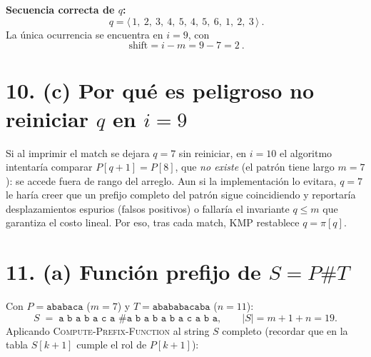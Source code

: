 \documentclass[11pt]{article}
\begin{document}
\smallskip
\noindent\textbf{Secuencia correcta de \(q\):}
\[
\boxed{\ q = \langle\,1,\ 2,\ 3,\ 4,\ 5,\ 4,\ 5,\ 6,\ 1,\ 2,\ 3\,\rangle\ }.
\]
La única ocurrencia se encuentra en \(i=9\), con
\[
\boxed{\ \text{shift} = i - m = 9 - 7 = 2\ }.
\]

\section*{10. (c) Por qué es peligroso no reiniciar \(q\) en \(i=9\)}

Si al imprimir el match se dejara \(q=7\) sin reiniciar, en \(i=10\) el algoritmo intentaría comparar \(P[q{+}1]=P[8]\), que \emph{no existe} (el patrón tiene largo \(m=7\)): se accede fuera de rango del arreglo. Aun si la implementación lo evitara, \(q=7\) le haría creer que un prefijo completo del patrón sigue coincidiendo y reportaría desplazamientos espurios (falsos positivos) o fallaría el invariante \(q\le m\) que garantiza el costo lineal. Por eso, tras cada match, KMP restablece \(q=\pi[q]\).

\clearpage

\section*{11. (a) Función prefijo de \(S=P\#T\)}

Con \(P=\texttt{ababaca}\) (\(m=7\)) y \(T=\texttt{abababacaba}\) (\(n=11\)):
\[
S \;=\; \texttt{a b a b a c a \# a b a b a b a c a b a},
\qquad |S| = m + 1 + n = 19.
\]
Aplicando \textsc{Compute-Prefix-Function} al string \(S\) completo (recordar que en la tabla \(S[k+1]\) cumple el rol de \(P[k+1]\)):
\end{document}
